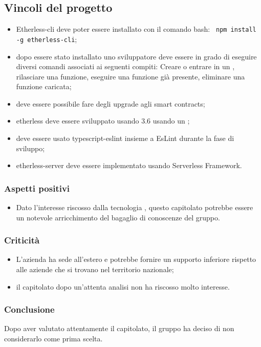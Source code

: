  \subsection{Vincoli del progetto}
    	   \begin{itemize}
    			\item Etherless-cli deve poter essere installato con il comando bash:
    			\verb! npm install -g etherless-cli!;

    			\item dopo essere stato installato uno sviluppatore deve essere in grado di eseguire diversi comandi associati ai seguenti compiti: Creare o entrare in un  , rilasciare una funzione, eseguire una funzione già presente, eliminare una funzione caricata;
    			\item deve essere possibile fare degli upgrade agli smart contracts;
    			\item etherless deve essere sviluppato usando  3.6 usando un ;
    			\item deve essere usato typescript-eslint insieme a EsLint durante la fase di sviluppo;
    			\item etherless-server deve essere implementato usando Serverless Framework.
	 \end{itemize}


    \subsubsection{Aspetti positivi}
	    \begin{itemize}
    			\item Dato l'interesse riscosso dalla tecnologia , questo capitolato potrebbe essere un notevole arricchimento del bagaglio di conoscenze del gruppo.
    	   \end{itemize}
    \subsubsection{Criticità}
    	   \begin{itemize}
    			\item L'azienda ha sede all'estero e potrebbe fornire un supporto inferiore rispetto alle aziende che si trovano nel territorio nazionale;
    			\item il capitolato dopo un'attenta analisi non ha riscosso molto interesse.
    	   \end{itemize}
    \subsubsection{Conclusione}
	Dopo aver valutato attentamente il capitolato, il gruppo ha deciso di non considerarlo come prima scelta.
